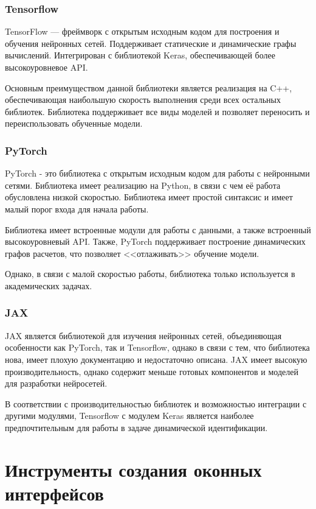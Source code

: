 \subsubsection{Tensorflow}

TensorFlow — фреймворк с открытым исходным кодом для построения и обучения
нейронных сетей. Поддерживает статические и динамические графы вычислений.
Интегрирован с библиотекой Keras, обеспечивающей более высокоуровневое API. 

Основным преимуществом данной библиотеки является реализация на C++,
обеспечивающая наибольшую скорость выполнения среди всех остальных библиотек.
Библиотека поддерживает все виды моделей и позволяет переносить и
переиспользовать обученные модели. 

\subsubsection{PyTorch}

PyTorch - это библиотека с открытым исходным кодом для работы с нейронными
сетями. Библиотека имеет реализацию на Python, в связи с чем её работа
обусловлена низкой скоростью. Библиотека имеет простой синтаксис и имеет малый
порог входа для начала работы. 

Библиотека имеет встроенные модули для работы с данными, а также встроенный
высокоуровневый API. Также, PyTorch поддерживает построение динамических графов
расчетов, что позволяет <<отлаживать>> обучение модели. 

Однако, в связи с малой скоростью работы, библиотека только используется в академических задачах. 

\subsubsection{JAX}

JAX является библиотекой для изучения нейронных сетей, объединяющая особенности
как PyTorch, так и Tensorflow, однако в связи с тем, что библиотека нова, имеет
плохую документацию и недостаточно описана. JAX имеет высокую
производительность, однако содержит меньше готовых компонентов и моделей для
разработки нейросетей. 

В соответствии с производительностью библиотек и возможностью интеграции с другими модулями, Tensorflow с модулем Keras является наиболее предпочтительным для работы в задаче динамической идентификации. 

\section{Инструменты создания оконных интерфейсов}

